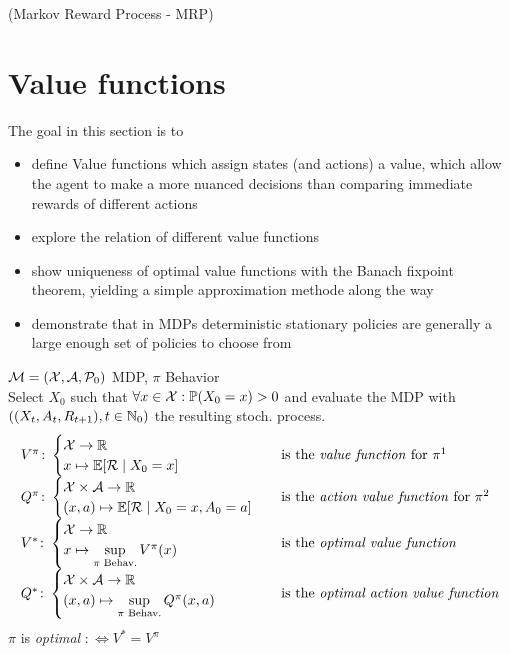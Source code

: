 \begin{definition}(Markov Reward Process - MRP)
\end{definition}
\section{Value functions}
The goal in this section is to
\begin{itemize}[itemsep=0pt, topsep=1pt]
\item define Value functions which assign states (and actions) a value, which allow the agent to make a more nuanced decisions than comparing immediate rewards of different actions
\item explore the relation of different value functions
\item show uniqueness of optimal value functions with the Banach fixpoint theorem, yielding a simple approximation methode along the way
\item demonstrate that in MDPs deterministic stationary policies are generally a large enough set of policies to choose from
 \end{itemize}
\begin{definition}\(\mathcal{M}=(\mathcal{X},\mathcal{A},\mathcal{P}_0)\) MDP, \(\pi\) Behavior\\
Select \(X_0\) such that \(\forall x\in\mathcal{X}:\mathbb{P}(X_0=x)>0\) and evaluate the MDP with
\(((X_t,A_t,R_{t+1}), t\in \mathbb{N}_0)\) the resulting stoch. process.\\
\def\arraystretch{3}
\[
\begin{array}{l l}
	V^\pi\colon
	\begin{cases}
		\cX\to\R\\
		x\mapsto \E[\cR\mid X_0=x]
	\end{cases} 
	& \text{is the \emph{value function} for } \pi \footnotemark\\
	Q^\pi\colon
	\begin{cases}
		\cX\times\cA\to\R\\
		(x,a)\mapsto \E[\cR\mid X_0=x, A_0=a]
	\end{cases}
	& \text{is the \emph{action value function} for } \pi \footnotemark\\
	V^*\colon
	\begin{cases}
		\cX\to\R\\
		x\mapsto \sup\limits_{\pi\text{ Behav.}} V^\pi(x)
	\end{cases} 
	& \text{is the \emph{optimal value function}}\\
	Q^*\colon
	\begin{cases}
		\cX\times\cA\to\R\\
		(x,a)\mapsto \sup\limits_{\pi\text{ Behav.}} Q^\pi(x,a)
	\end{cases}
	& \text{is the \emph{optimal action value function}}
\end{array}
\]
\(\pi\) is \emph{optimal} \(:\iff V^*=V^\pi\)
\end{definition}

